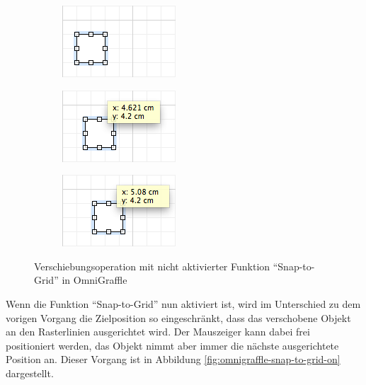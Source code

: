\begin{figure}[hbt]
    \newcommand{\subfigurewidth}{0.33\textwidth}
    \newcommand{\graphicswidth}{0.95\linewidth}
    \begin{subfigure}{\subfigurewidth}
        \centering
        \includegraphics[width=\graphicswidth]{resources/omnigraffle-snap-to-grid-off-a}
        \caption{}
    \end{subfigure}
    \begin{subfigure}{\subfigurewidth}
        \centering
        \includegraphics[width=\graphicswidth]{resources/omnigraffle-snap-to-grid-off-b}
        \caption{}
    \end{subfigure}
    \begin{subfigure}{\subfigurewidth}
        \centering
        \includegraphics[width=\graphicswidth]{resources/omnigraffle-snap-to-grid-off-c}
        \caption{}
    \end{subfigure}
    \caption{Verschiebungsoperation mit nicht aktivierter Funktion \enquote{Snap-to-Grid} in OmniGraffle}
    \label{fig:omnigraffle-snap-to-grid-off}
\end{figure}

Wenn die Funktion \enquote{Snap-to-Grid} nun aktiviert ist, wird im Unterschied zu dem vorigen Vorgang die Zielposition so eingeschränkt, dass das verschobene Objekt an den Rasterlinien ausgerichtet wird. Der Mauszeiger kann dabei frei positioniert werden, das Objekt nimmt aber immer die nächste ausgerichtete Position an. Dieser Vorgang ist in Abbildung \ref{fig:omnigraffle-snap-to-grid-on} dargestellt.


